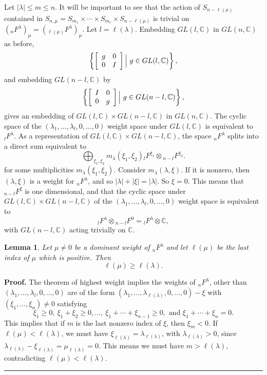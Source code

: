 \documentclass[12pt]{article}%
\newtheorem{lemma}[theorem]{Lemma}
\newenvironment{proof}[1][Proof]{\noindent\textbf{#1.} }{\ \rule{0.5em}{0.5em}}
\begin{document}
Let $|\lambda| \leq m \leq n$. It will be important to see that the action of
$S_{n-\ell(\mu)} $ contained in $S_{n,\mu} = S_{m_{1}} \times\cdots\times
S_{m_{r}}\times S_{n-\ell(\mu)}$ is trivial on $({}_{n}F^{\lambda})_{\mu}=
({}_{\ell(\mu)} F^{\lambda})_{\mu}$. Let $l = \ell(\lambda)$. Embedding
$GL(l,\mathbb{C})$ in $GL(n,\mathbb{C})$ as before,%
\[
\left\{  \left[
\begin{array}
[c]{cc}%
g & 0\\
0 & I
\end{array}
\right]  \Big|~ g\in GL(l,\mathbb{C})\right\}  ,
\]
and embedding $GL(n-l,\mathbb{C})$ by
\[
\left\{  \left[
\begin{array}
[c]{cc}%
I & 0\\
0 & g
\end{array}
\right]  \Big|~ g\in GL(n-l,\mathbb{C})\right\}  ,
\]
gives an embedding of $GL(l,\mathbb{C}) \times GL(n-l,\mathbb{C})$ in
$GL(n,\mathbb{C}).$ The cyclic space of the $(\lambda_{1},\dots,\lambda
_{l},0,\dots,0)$ weight space under $GL(l,\mathbb{C})$ is equivalent to
${}_{l} F^{\lambda}$. As a representation of $GL(l,\mathbb{C}) \times
GL(n-l,\mathbb{C})$, the space ${}_{n}F^{\lambda}$ splits into a direct sum
equivalent to
\[
\bigoplus_{\xi_{1},\xi_{2}} m_{\lambda}(\xi_{1},\xi_{2}) {}_{l} F^{\xi_{1}}
\otimes{}_{n-l}F^{\xi_{2}}.
\]
for some multiplicities $m_{\lambda}(\xi_{1},\xi_{2}) $. Consider $m_{\lambda
}(\lambda,\xi)$. If it is nonzero, then $(\lambda,\xi)$ is a weight for
${}_{n}F^{\lambda}$, and so $|\lambda| +|\xi| = |\lambda|$. So $\xi= 0$. This
means that ${}_{n-l} F^{\xi}$ is one dimensional, and that the cyclic space
under $GL(l,\mathbb{C}) \times GL(n-l,\mathbb{C})$ of the $(\lambda_{1},\dots,
\lambda_{l},0,\dots, 0)$ weight space is equivalent to
\[
{}_{l} F^{\lambda}\otimes{}_{n-l}F^{0} = {}_{l}F^{\lambda} \otimes\mathbb{C},
\]
with $GL(n-l,\mathbb{C})$ acting trivially on $\mathbb{C}$.

\begin{lemma}
Let $\mu\neq0$ be a dominant weight of ${}_{n}F^{\lambda}$ and let $\ell(\mu)$
be the last index of $\mu$ which is positive. Then
\[
\ell(\mu) \geq\ell(\lambda).
\]

\end{lemma}

\begin{proof}
The theorem of highest weight implies the weights of ${}_{n}F^{\lambda}$,
other than $(\lambda_{1},\dots, \lambda_{l},0,\dots,0)$ are of the form
$(\lambda_{1},\dots, \lambda_{\ell(\lambda)},0,\dots,0) - \xi$ with $(\xi
_{1},\dots,\xi_{n}) \neq0$ satisfying
\[
\xi_{1} \geq0, ~ \xi_{1}+\xi_{2} \geq0, \dots, ~ \xi_{1}+\cdots+\xi_{n-1}
\geq0, \text{ and } \xi_{1}+\cdots+\xi_{n} = 0.
\]
This implies that if $m$ is the last nonzero index of $\xi$, then $\xi_{m}<0$.
If $\ell(\mu) < \ell(\lambda)$, we must have $\xi_{\ell(\lambda)} =
\lambda_{\ell(\lambda)}$, with $\lambda_{\ell(\lambda)} >0$, since
$\lambda_{\ell(\lambda)}-\xi_{\ell(\lambda)} = \mu_{\ell(\lambda)} =0$. This
means we must have $m>\ell(\lambda)$, contradicting $\ell(\mu) < \ell
(\lambda)$.
\end{proof}
\end{document}
